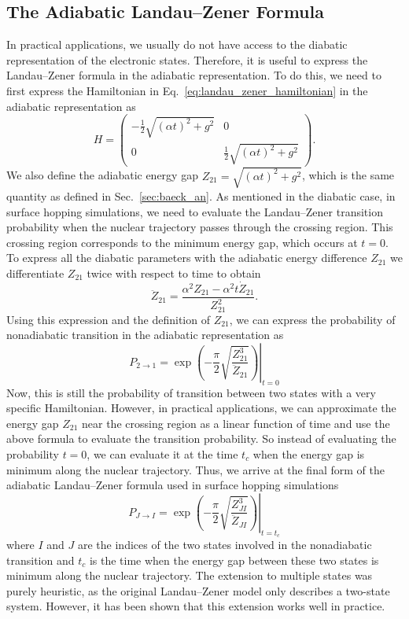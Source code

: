 \subsection{The Adiabatic Landau--Zener Formula}
In practical applications, we usually do not have access to the diabatic representation of the electronic states. Therefore, it is useful to express the Landau--Zener formula in the adiabatic representation. To do this, we need to first express the Hamiltonian in Eq.~\eqref{eq:landau_zener_hamiltonian} in the adiabatic representation as
\begin{equation}
H=\begin{pmatrix}
-\frac{1}{2}\sqrt{(\alpha t)^2+g^2}&0\\
0&\frac{1}{2}\sqrt{(\alpha t)^2+g^2}
\end{pmatrix}.
\end{equation}
We also define the adiabatic energy gap $Z_{21}=\sqrt{(\alpha t)^2+g^2}$, which is the same quantity as defined in Sec.~\ref{sec:baeck_an}. As mentioned in the diabatic case, in surface hopping simulations, we need to evaluate the Landau--Zener transition probability when the nuclear trajectory passes through the crossing region. This crossing region corresponds to the minimum energy gap, which occurs at $t=0$. To express all the diabatic parameters with the adiabatic energy difference $Z_{21}$ we differentiate $Z_{21}$ twice with respect to time to obtain
\begin{equation}
\ddot Z_{21}=\frac{\alpha^2Z_{21}-\alpha^2t\dot Z_{21}}{Z_{21}^2}.
\end{equation}
Using this expression and the definition of $Z_{21}$, we can express the probability of nonadiabatic transition in the adiabatic representation as
\begin{equation}\label{eq:landau_zener_adiabatic_2to1}
P_{2\to1}=\left.\exp\left(-\frac{\pi}{2}\sqrt{\frac{Z_{21}^3}{\ddot Z_{21}}}\right)\right\rvert_{t=0}
\end{equation}
Now, this is still the probability of transition between two states with a very specific Hamiltonian. However, in practical applications, we can approximate the energy gap $Z_{21}$ near the crossing region as a linear function of time and use the above formula to evaluate the transition probability. So instead of evaluating the probability $t=0$, we can evaluate it at the time $t_c$ when the energy gap is minimum along the nuclear trajectory. Thus, we arrive at the final form of the adiabatic Landau--Zener formula used in surface hopping simulations\supercite{10.1103/PhysRevA.84.014701}
\begin{equation}\label{eq:landau_zener_adiabatic}
P_{J\to I}=\left.\exp\left(-\frac{\pi}{2}\sqrt{\frac{Z_{JI}^3}{\ddot Z_{JI}}}\right)\right\rvert_{t=t_c}
\end{equation}
where $I$ and $J$ are the indices of the two states involved in the nonadiabatic transition and $t_c$ is the time when the energy gap between these two states is minimum along the nuclear trajectory. The extension to multiple states was purely heuristic, as the original Landau--Zener model only describes a two-state system. However, it has been shown that this extension works well in practice.\supercite{10.1021/acs.jctc.0c00512}


